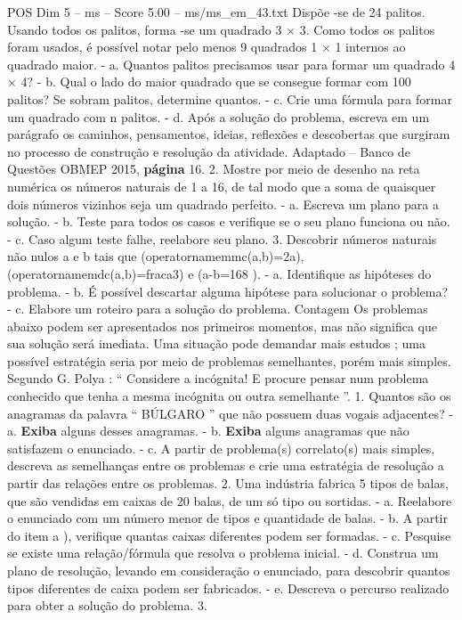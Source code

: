 \begin{textsample}{POS Dim 5 – ms – Score 5.00 – ms/ms\_em\_43.txt}
Dispõe -se de 24 palitos.
Usando todos os palitos, forma -se um quadrado 3 × 3.
Como todos os palitos foram usados, é possível notar pelo menos 9 quadrados 1 × 1 internos ao quadrado maior. - a.
Quantos palitos precisamos usar para formar um quadrado 4 × 4? - b.
Qual o lado do maior quadrado que se consegue formar com 100 palitos?
Se sobram palitos, determine quantos. - c.
Crie uma fórmula para formar um quadrado com n palitos. - d.
Após a solução do problema, escreva em um parágrafo os caminhos, pensamentos, ideias, reflexões e descobertas que surgiram no processo de construção e resolução da atividade.
Adaptado – Banco de Questões OBMEP 2015, \textbf{página} 16. 2.
Mostre por meio de desenho na reta numérica os números naturais de 1 a 16, de tal modo que a soma de quaisquer dois números vizinhos seja um quadrado perfeito. - a.
Escreva um plano para a solução. - b.
Teste para todos os casos e verifique se o seu plano funciona ou não. - c.
Caso algum teste falhe, reelabore seu plano. 3.
Descobrir números naturais não nulos a e b tais que (operatornamemmc(a,b)=2a), (operatornamemdc(a,b)=fraca3) e (a-b=168 ). - a.
Identifique as hipóteses do problema. - b.
É possível descartar alguma hipótese para solucionar o problema? - c.
Elabore um roteiro para a solução do problema.
Contagem Os problemas abaixo podem ser apresentados nos primeiros momentos, mas não significa que sua solução será imediata.
Uma situação pode demandar mais estudos ; uma possível estratégia seria por meio de problemas semelhantes, porém mais simples.
Segundo G.
Polya : “ Considere a incógnita!
E procure pensar num problema conhecido que tenha a mesma incógnita ou outra semelhante ”. 1.
Quantos são os anagramas da palavra “ BÚLGARO ” que não possuem duas vogais adjacentes? - a. \textbf{Exiba} alguns desses anagramas. - b. \textbf{Exiba} alguns anagramas que não satisfazem o enunciado. - c.
A partir de problema(s) correlato(s) mais simples, descreva as semelhanças entre os problemas e crie uma estratégia de resolução a partir das relações entre os problemas. 2.
Uma indústria fabrica 5 tipos de balas, que são vendidas em caixas de 20 balas, de um só tipo ou sortidas. - a.
Reelabore o enunciado com um número menor de tipos e quantidade de balas. - b.
A partir do item a ), verifique quantas caixas diferentes podem ser formadas. - c.
Pesquise se existe uma relação/fórmula que resolva o problema inicial. - d.
Construa um plano de resolução, levando em consideração o enunciado, para descobrir quantos tipos diferentes de caixa podem ser fabricados. - e.
Descreva o percurso realizado para obter a solução do problema. 3.

\end{textsample}
